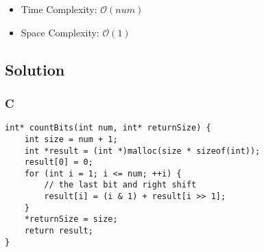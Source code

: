 \begin{itemize}
    \item Time Complexity: $\mathcal{O}(num)$
    \item Space Complexity: $\mathcal{O}(1)$
\end{itemize}

\subsection*{Solution}
\subsubsection*{C}
\begin{verbatim}
int* countBits(int num, int* returnSize) {
    int size = num + 1;
    int *result = (int *)malloc(size * sizeof(int));
    result[0] = 0;
    for (int i = 1; i <= num; ++i) {
        // the last bit and right shift
        result[i] = (i & 1) + result[i >> 1];
    }
    *returnSize = size;
    return result;
}
\end{verbatim}

\newpage

